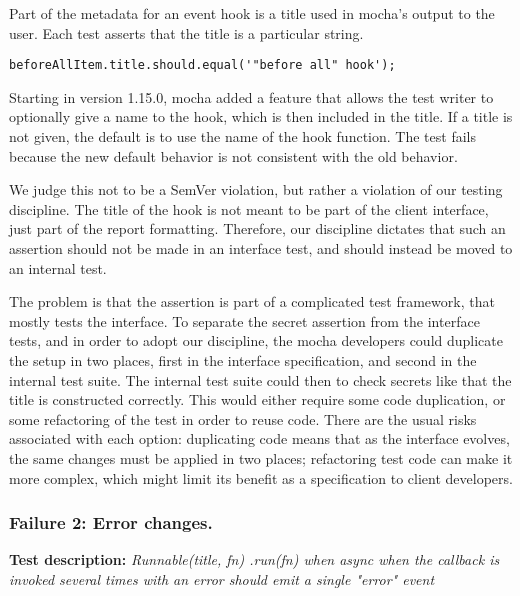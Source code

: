 Part of the metadata for an event hook is a title used in mocha's
output to the user. Each test asserts that the title is a particular
string.

{\small
\begin{verbatim}
beforeAllItem.title.should.equal('"before all" hook');
\end{verbatim}
}

Starting in version 1.15.0, mocha added a feature that allows the test
writer to optionally give a name to the hook, which is then included
in the title. If a title is not given, the default is to use the name
of the hook function. The test fails because the new default behavior
is not consistent with the old behavior.

We judge this not to be a SemVer violation, but rather a violation of
our testing discipline. The title of the hook is not meant to be part
of the client interface, just part of the report
formatting. Therefore, our discipline dictates that such an assertion
should not be made in an interface test, and should instead be moved
to an internal test.

The problem is that the assertion is part of a complicated test
framework, that mostly tests the interface. To separate the
secret assertion from the interface tests, and in order to adopt our
discipline, the mocha developers could duplicate the setup in two places,
first in the interface specification, and second in the
internal test suite. The internal test suite could then to check secrets
like that the title is constructed correctly. This would either require
some code duplication, or some refactoring of the test in order to reuse
code. There are the usual risks associated with each option: duplicating
code means that as the interface evolves, the same changes must be
applied in two places; refactoring test code can make it more complex,
which might limit its benefit as a specification to client developers.

\subsubsection{Failure 2: Error changes.}
\label{sec:failure2}
{\bf Test description: }
%
{\em Runnable(title, fn) .run(fn) when async when the callback is
  invoked several times with an error should emit a single "error"
  event }

